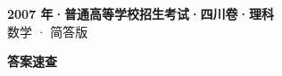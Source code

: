 \documentclass[zihao=-4, a4paper]{ctexart}
\begin{document}
\begin{center}
  {\Large\bfseries 2007 年·普通高等学校招生考试·四川卷·理科}\\[4pt]
  {\large 数学 · 简答版}
\end{center}
\medskip
{}

\clearpage
{}
\begin{center}{\Large\bfseries 答案速查}\end{center}
\medskip

\end{document}
